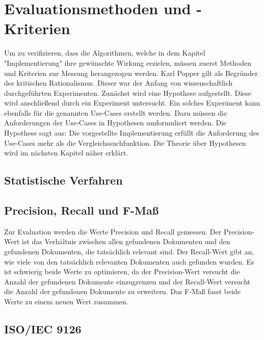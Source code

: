 \chapter{Evaluationsmethoden und -Kriterien}

Um zu verifizieren, dass die Algorithmen, welche in dem Kapitel "Implementierung" ihre gewünschte Wirkung erzielen, müssen zuerst Methoden und Kriterien zur Messung herangezogen werden.
Karl Popper gilt als Begründer des kritischen Rationalismus.
Dieser war der Anfang von wissenschaftlich durchgeführten Experimenten.
Zunächst wird eine Hypothese aufgestellt.
Diese wird anschließend durch ein Experiment untersucht.
Ein solches Experiment kann ebenfalls für die genannten Use-Cases erstellt werden.
Dazu müssen die Anforderungen der Use-Cases in Hypothesen umformuliert werden.
Die Hypothese sagt aus: Die vorgestellte Implementierung erfüllt die Anforderung des Use-Cases mehr als die Vergleichssuchfunktion.
Die Theorie über Hypothesen wird im nächsten Kapitel näher erklärt.

\section{Statistische Verfahren}

\section{Precision, Recall und F-Maß}
Zur Evaluation werden die Werte Precision und Recall gemessen.
Der Precision-Wert ist das Verhältnis zwischen allen gefundenen Dokumenten und den gefundenen Dokumenten, die tatsächlich relevant sind.
Der Recall-Wert gibt an, wie viele von den tatsächlich relevanten Dokumenten auch gefunden wurden.
Es ist schwierig beide Werte zu optimieren, da der Precision-Wert versucht die Anzahl der gefundenen Dokumente einzugrenzen und der Recall-Wert versucht die Anzahl der gefundenen Dokumente zu erweitern.
Das F-Maß fasst beide Werte zu einem neuen Wert zusammen.


\section{ISO/IEC 9126}

